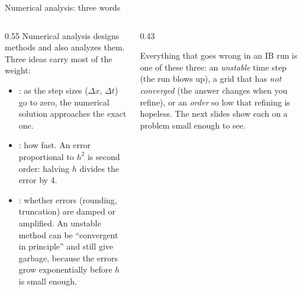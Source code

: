\documentclass[aspectratio=169,11pt]{beamer}
\begin{document}
\begin{frame}{Numerical analysis: three words}
\begin{columns}[T,onlytextwidth]
\begin{column}{0.55\textwidth}
Numerical analysis designs methods and also analyzes them. Three ideas carry most of the weight:
\begin{itemize}
  \item {}: as the step sizes ($\Delta x$, $\Delta t$) go to zero, the numerical solution approaches the exact one.
  \item {}: how fast. An error proportional to $h^2$ is second order: halving $h$ divides the error by 4.
  \item {}: whether errors (rounding, truncation) are damped or amplified. An unstable method can be ``convergent in principle'' and still give garbage, because the errors grow exponentially before $h$ is small enough.
\end{itemize}
\end{column}
\begin{column}{0.43\textwidth}
\begin{punchbox}
\small Everything that goes wrong in an IB run is one of these three: an \emph{unstable} time step (the run blows up), a grid that has \emph{not converged} (the answer changes when you refine), or an \emph{order} so low that refining is hopeless. The next slides show each on a problem small enough to see.
\end{punchbox}
\end{column}
\end{columns}
\end{frame}
\end{document}
